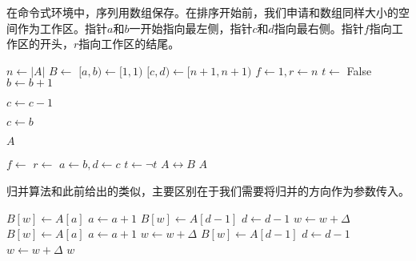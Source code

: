 \documentclass[UTF8]{article}
\begin{document}
在命令式环境中，序列用数组保存。在排序开始前，我们申请和数组同样大小的空间作为工作区。指针$a$和$b$一开始指向最左侧，指针$c$和$d$指向最右侧。指针$f$指向工作区的开头，$r$指向工作区的结尾。

\begin{algorithmic}[1]
    \State $n \gets |A|$
    \State $B \gets$   
    \Loop
      \State $[a, b) \gets [1, 1)$
      \State $[c, d) \gets [n+1, n+1)$
      \State $f \gets 1, r \gets n$ 
      \State $t \gets $ False 
       
        \Repeat \Comment{扩展$[a, b)$}
          \State $b \gets b + 1$

        \Repeat \Comment{扩展$[c, d)$}
          \State $c \gets c - 1$

         
          \State $c \gets b$
        \EndIf

         \Comment{若$[a, b)$扩展到整个数组则结束}
          \State \Return $A$
        \EndIf

         
          \State $f \gets$ \Call{Merge}{$A, [a, b), [c, d), B, f, 1$}
        \Else {}
          \State $r \gets$ \Call{Merge}{$A, [a, b), [c, d), B, r, -1$}
        \EndIf
        \State $a \gets b, d \gets c$
        \State $t \gets \lnot t$ 
      \EndWhile
      \State {} $A \leftrightarrow B$ 
    \EndLoop
  \EndIf
  \State \Return $A$
\EndFunction
\end{algorithmic}

归并算法和此前给出的类似，主要区别在于我们需要将归并的方向作为参数传入。

\begin{algorithmic}[1]
\Function{Merge}{$A, [a, b), [c, d), B, w, \Delta$}
      \State $B[w] \gets A[a]$
      \State $a \gets a + 1$
    \Else
      \State $B[w] \gets A[d-1]$
      \State $d \gets d - 1$
    \EndIf
    \State $w \gets w + \Delta$
  \EndWhile
    \State $B[w] \gets A[a]$
    \State $a \gets a + 1$
    \State $w \gets w + \Delta$
  \EndWhile
    \State $B[w] \gets A[d-1]$
    \State $d \gets d - 1$
    \State $w \gets w + \Delta$
  \EndWhile
  \State \Return $w$
\EndFunction
\end{algorithmic}
\end{document}

